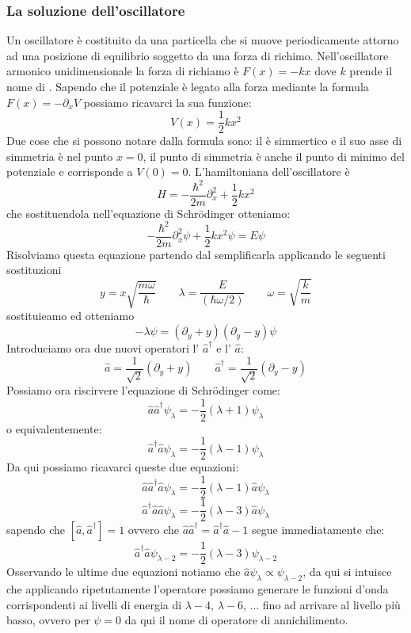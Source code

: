 \subsubsection{La soluzione dell'oscillatore}
Un oscillatore è costituito da una particella che si muove periodicamente attorno ad una posizione di equilibrio soggetto da una forza di richimo. Nell'oscillatore armonico unidimensionale la forza di richiamo è $F(x) = -kx$ dove $k$ prende il nome di . Sapendo che il potenziale è legato alla forza mediante la formula $F(x) = -\partial_x V$ possiamo ricavarci la sua funzione:
$$V(x) = \frac{1}{2}kx^2$$
Due cose che si possono notare dalla formula sono: il  è simmertico e il suo asse di simmetria è nel punto $x = 0$, il punto di simmetria è anche il punto di minimo del potenziale e corrisponde a $V(0) = 0$.
L'hamiltoniana dell'oscillatore è
$$H = - \frac{\hbar^2}{2m} \partial_x^2 + \frac{1}{2}kx^2$$
che sostituendola nell'equazione di Schr\"odinger otteniamo:
$$- \frac{\hbar^2}{2m} \partial_x^2\psi + \frac{1}{2}kx^2\psi = E\psi$$
Risolviamo questa equazione partendo dal semplificarla applicando le seguenti sostituzioni
$$y = x\sqrt{\frac{m\omega}{\hbar}} \qquad \lambda = \frac{E}{(\hbar \omega / 2)} \qquad \omega = \sqrt{\frac{k}{m}}$$
sostituieamo ed otteniamo
$$-\lambda \psi = (\partial_y + y)(\partial_y - y)\psi$$
Introduciamo ora due nuovi operatori l' $\hat{a}^{\dagger}$ e l' $\hat{a}$:
$$\hat{a} = \frac{1}{\sqrt{2}}(\partial_y + y) \qquad \hat{a}^{\dagger} = \frac{1}{\sqrt{2}}(\partial_y - y)$$
Possiamo ora riscirvere l'equazione di Schr\"odinger come:
$$\hat{a}\hat{a}^{\dagger}\psi_{\lambda} = -\frac{1}{2}(\lambda + 1) \psi_{\lambda}$$
o equivalentemente:
$$\hat{a}^{\dagger}\hat{a}\psi_{\lambda} = -\frac{1}{2}(\lambda - 1) \psi_{\lambda}$$
Da qui possiamo ricavarci queste due equazioni:
$$\hat{a}\hat{a}^{\dagger}\hat{a}\psi_{\lambda} = -\frac{1}{2}(\lambda - 1) \hat{a}\psi_{\lambda}$$
$$\hat{a}^{\dagger}\hat{a}\hat{a}\psi_{\lambda} = -\frac{1}{2}(\lambda - 3) \hat{a}\psi_{\lambda}$$
sapendo che $[\hat{a}, \hat{a}^{\dagger}] = 1$ ovvero che $\hat{a}\hat{a}^{\dagger} = \hat{a}^{\dagger}\hat{a} - 1$ segue immediatamente che:
$$\hat{a}^{\dagger}\hat{a}\psi_{\lambda-2} = -\frac{1}{2}(\lambda - 3) \psi_{\lambda-2}$$
Osservando le ultime due equazioni notiamo che $\hat{a}\psi_{\lambda} \propto \psi_{\lambda-2}$, da qui si intuisce che applicando ripetutamente l'operatore possiamo generare le funzioni d'onda corrispondenti ai livelli di energia di $\lambda-4$, $ \lambda-6$, ... fino ad arrivare al livello più basso, ovvero per $\psi = 0$ da qui il nome di operatore di annichilimento.
